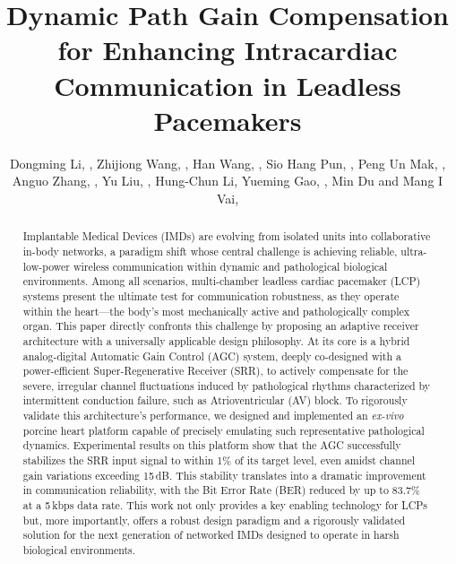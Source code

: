 \documentclass[journal]{IEEEtran}
\begin{document}
\title{Dynamic Path Gain Compensation for Enhancing Intracardiac Communication in Leadless Pacemakers}

\author{
  Dongming Li, ,
 Zhijiong Wang, ,
  Han Wang, ,
  Sio Hang Pun, ,
  Peng Un Mak, ,
  Anguo Zhang, ,
  Yu Liu, ,
  Hung-Chun Li,
  Yueming Gao, ,
  Min Du and Mang I Vai, 
}

\maketitle

\begin{abstract}
Implantable Medical Devices (IMDs) are evolving from isolated units into collaborative in-body networks, a paradigm shift whose central challenge is achieving reliable, ultra-low-power wireless communication within dynamic and pathological biological environments. Among all scenarios, multi-chamber leadless cardiac pacemaker (LCP) systems present the ultimate test for communication robustness, as they operate within the heart—the body's most mechanically active and pathologically complex organ. This paper directly confronts this challenge by proposing an adaptive receiver architecture with a universally applicable design philosophy. At its core is a hybrid analog-digital Automatic Gain Control (AGC) system, deeply co-designed with a power-efficient Super-Regenerative Receiver (SRR), to actively compensate for the severe, irregular channel fluctuations induced by pathological rhythms characterized by intermittent conduction failure, such as Atrioventricular (AV) block. To rigorously validate this architecture's performance, we designed and implemented an \textit{ex-vivo} porcine heart platform capable of precisely emulating such representative pathological dynamics. Experimental results on this platform show that the AGC successfully stabilizes the SRR input signal to within 1\% of its target level, even amidst channel gain variations exceeding 15\,dB. This stability translates into a dramatic improvement in communication reliability, with the Bit Error Rate (BER) reduced by up to 83.7\% at a 5\,kbps data rate. This work not only provides a key enabling technology for LCPs but, more importantly, offers a robust design paradigm and a rigorously validated solution for the next generation of networked IMDs designed to operate in harsh biological environments.
\end{abstract}
\end{document}
